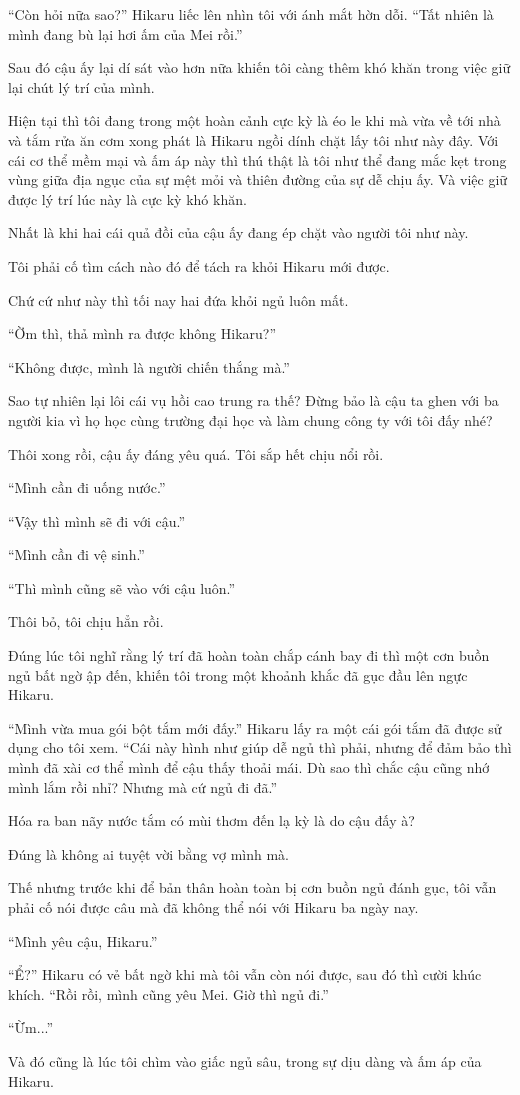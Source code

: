 {    ``Còn hỏi nữa sao?'' Hikaru liếc lên nhìn tôi với ánh mắt hờn dỗi. ``Tất
    nhiên là mình đang bù lại hơi ấm của Mei rồi.''

    Sau đó cậu ấy lại dí sát vào hơn nữa khiến tôi càng thêm khó khăn trong
    việc giữ lại chút lý trí của mình.

    Hiện tại thì tôi đang trong một hoàn cảnh cực kỳ là éo le khi mà vừa về
    tới nhà và tắm rửa ăn cơm xong phát là Hikaru ngồi dính chặt lấy tôi như
    này đây. Với cái cơ thể mềm mại và ấm áp này thì thú thật là tôi như thể
    đang mắc kẹt trong vùng giữa địa ngục của sự mệt mỏi và thiên đường của
    sự dễ chịu ấy. Và việc giữ được lý trí lúc này là cực kỳ khó khăn.

    Nhất là khi hai cái quả đồi của cậu ấy đang ép chặt vào người tôi như
    này.

    Tôi phải cố tìm cách nào đó để tách ra khỏi Hikaru mới được.

    Chứ cứ như này thì tối nay hai đứa khỏi ngủ luôn mất.

    ``Ờm thì, thả mình ra được không Hikaru?''

    ``Không được, mình là người chiến thắng mà.''

    Sao tự nhiên lại lôi cái vụ hồi cao trung ra thế? Đừng bảo là cậu ta
    ghen với ba người kia vì họ học cùng trường đại học và làm chung công ty
    với tôi đấy nhé?

    Thôi xong rồi, cậu ấy đáng yêu quá. Tôi sắp hết chịu nổi rồi.

    ``Mình cần đi uống nước.''

    ``Vậy thì mình sẽ đi với cậu.''

    ``Mình cần đi vệ sinh.''

    ``Thì mình cũng sẽ vào với cậu luôn.''

    Thôi bỏ, tôi chịu hẳn rồi.

    Đúng lúc tôi nghĩ rằng lý trí đã hoàn toàn chắp cánh bay đi thì một cơn
    buồn ngủ bất ngờ ập đến, khiến tôi trong một khoảnh khắc đã gục đầu lên
    ngực Hikaru.

    ``Mình vừa mua gói bột tắm mới đấy.'' Hikaru lấy ra một cái gói tắm đã
    được sử dụng cho tôi xem. ``Cái này hình như giúp dễ ngủ thì phải, nhưng
    để đảm bảo thì mình đã xài cơ thể mình để cậu thấy thoải mái. Dù sao thì
    chắc cậu cũng nhớ mình lắm rồi nhỉ? Nhưng mà cứ ngủ đi đã.''

    Hóa ra ban nãy nước tắm có mùi thơm đến lạ kỳ là do cậu đấy à?

    Đúng là không ai tuyệt vời bằng vợ mình mà.

    Thế nhưng trước khi để bản thân hoàn toàn bị cơn buồn ngủ đánh gục, tôi
    vẫn phải cố nói được câu mà đã không thể nói với Hikaru ba ngày nay.

    ``Mình yêu cậu, Hikaru.''

    ``Ể?'' Hikaru có vẻ bất ngờ khi mà tôi vẫn còn nói được, sau đó thì cười
    khúc khích. ``Rồi rồi, mình cũng yêu Mei. Giờ thì ngủ đi.''

    ``Ừm...''

    Và đó cũng là lúc tôi chìm vào giấc ngủ sâu, trong sự dịu dàng và ấm áp
    của Hikaru.
}